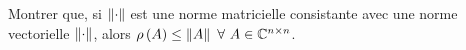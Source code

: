 Montrer que, si $\left\lVert\cdot\right\rVert$ est une norme matricielle consistante avec une norme vectorielle $\left\lVert\cdot\right\rVert$, alors $\rho \left(A\right) \leq \left\lVert A\right\rVert \ \forall \ A \in \mathbb{C}^{n \times n}$.